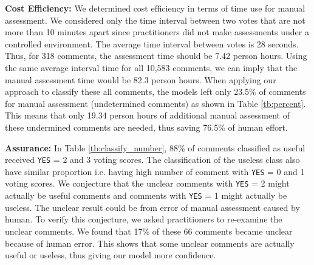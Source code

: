 \textbf{Cost Efficiency:}
We determined cost efficiency in terms of time use for manual assessment.
We considered only the time interval between two votes that are not more than 10 minutes apart since  practitioners did not make assessments under a controlled environment.
The average time interval between votes is 28 seconds.
Thus, for 318 comments, the assessment time should be 7.42 person hours.
Using the same average interval time for all 10,583 comments,
we can imply that the manual assessment time would be 82.3 person hours.
When applying our approach to classify these all comments, the models left only 23.5\% of comments for manual assessment (undetermined comments) as shown in Table \ref{tb:percent}.
This means that only 19.34 person hours of additional manual assessment of these undermined comments are needed, thus saving 76.5\% of human effort.

%
%
%

\textbf{Assurance:} In Table \ref{tb:classify_number},
88\% of comments classified as useful received \texttt{YES} = 2 and 3 voting scores.
The classification of the useless class also have similar proportion i.e. having high number of comment with \texttt{YES} = 0 and 1 voting scores.
We conjecture that the unclear comments with \texttt{YES} = 2 might actually be useful comments and comments with \texttt{YES} = 1 might actually be useless.
The unclear result could be from error of manual assessment caused by human.
To verify this conjecture, we asked practitioners to re-examine the unclear comments.
We found that 17\% of these 66 comments became unclear because of human error.
This shows that some unclear comments are actually useful or useless, thus giving our model more confidence.

